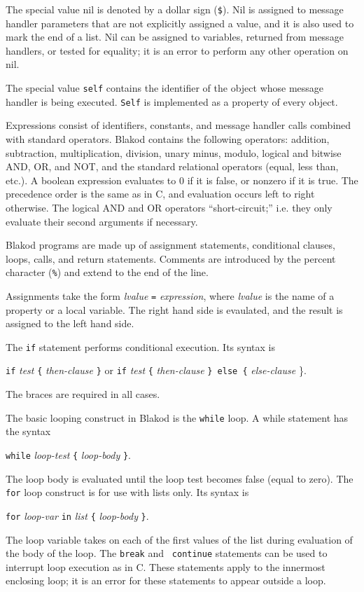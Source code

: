 \documentclass[12pt]{article}
\begin{document}
The special value nil is denoted by a dollar sign ({\tt \$}).  Nil is
assigned to message handler parameters that are not explicitly
assigned a value, and it is also used to mark the end of a list.  Nil
can be assigned to variables, returned from message handlers, or
tested for equality; it is an error to perform any other operation on
nil.

The special value {\tt self} contains the identifier of the object
whose message handler is being executed.  {\tt Self} is implemented as a
property of every object.

Expressions consist of identifiers, constants, and message handler
calls combined with standard operators.  Blakod contains the following
operators: addition, subtraction, multiplication, division, unary
minus, modulo, logical and bitwise AND, OR, and NOT, and the standard
relational operators (equal, less than, etc.).  A boolean expression
evaluates to 0 if it is false, or nonzero if it is true.  The
precedence order is the same as in C, and evaluation occurs left to
right otherwise.  The logical AND and OR operators ``short-circuit;''
i.e. they only evaluate their second arguments if necessary.

Blakod programs are made up of assignment statements, conditional
clauses, loops, calls, and return statements.  Comments are introduced
by the percent character ({\tt \%}) and extend to the end of the
line.

Assignments take the form {\em lvalue} {\tt =} {\em expression}, where
{\em lvalue} is the name of a property or a local variable.  The right
hand side is evaulated, and the result is assigned to the left hand
side.

The {\tt if} statement performs conditional execution.  Its syntax is
\begin{center}
{\tt if} {\em test} {\tt \{} {\em then-clause} {\tt \}} or
\linebreak
{\tt if} {\em test} {\tt \{} {\em then-clause} {\tt \} else \{} {\em
else-clause} {\}}.
\end{center}
The braces are required in all cases.

The basic looping construct in Blakod is the {\tt while} loop.  A while
statement has the syntax 
\begin{center}
{\tt while} {\em loop-test} {\tt \{} {\em loop-body} {\tt \}}.
\end{center}
The loop body is evaluated until the loop test becomes false (equal to
zero).  The {\tt for} loop construct is for use with lists only.  Its
syntax is
\begin{center}
{\tt for} {\em loop-var} {\tt in} {\em list} {\tt \{} {\em loop-body} {\tt \}}.
\end{center}
The loop variable takes on each of the first values of the list during
evaluation of the body of the loop.  The {\tt break} and {\tt
continue} statements can be used to interrupt loop execution as in C.
These statements apply to the innermost enclosing loop; it is an error
for these statements to appear outside a loop.
\end{document}
